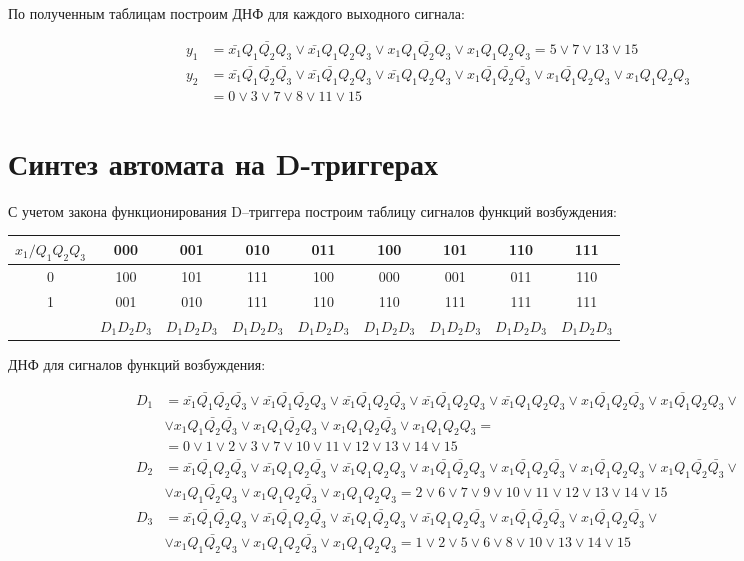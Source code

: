 \documentclass[12pt, a4paper]{article}
\begin{document}
По полученным таблицам построим ДНФ для каждого выходного сигнала:

\begin{align*}
  y_1 &= \bar{x_1}Q_1\bar{Q_2}Q_3 \lor \bar{x_1}Q_1Q_2Q_3 \lor x_1Q_1\bar{Q_2}Q_3 \lor x_1Q_1Q_2Q_3 = 5 \lor 7 \lor 13 \lor 15\\
  y_2 &= \bar{x_1}\bar{Q_1}\bar{Q_2}\bar{Q_3} \lor \bar{x_1}\bar{Q_1}Q_2Q_3 \lor \bar{x_1}Q_1Q_2Q_3 \lor x_1\bar{Q_1}\bar{Q_2}\bar{Q_3} \lor x_1\bar{Q_1}Q_2Q_3 \lor x_1Q_1Q_2Q_3\\
    &= 0 \lor 3 \lor 7 \lor 8 \lor 11 \lor 15
\end{align*}

\section*{Синтез автомата на D-триггерах}

С учетом закона функционирования D–триггера построим таблицу сигналов функций возбуждения:

\noindent
\begin{tabular}{|*{9}{c|}}
  \hline
  $x_1/Q_1Q_2Q_3$ & 000 & 001 & 010 & 011 & 100 & 101 & 110 & 111\\\hline
  0 & 100 & 101 & 111 & 100 & 000 & 001 & 011 & 110\\\hline
  1 & 001 & 010 & 111 & 110 & 110 & 111 & 111 & 111\\\hline
   & $D_1D_2D_3$ & $D_1D_2D_3$ & $D_1D_2D_3$ & $D_1D_2D_3$ & $D_1D_2D_3$ & $D_1D_2D_3$ & $D_1D_2D_3$ & $D_1D_2D_3$\\\hline
\end{tabular}

ДНФ для сигналов функций возбуждения:

\begin{align*}
  D_1 &= \bar{x_1}\bar{Q_1}\bar{Q_2}\bar{Q_3} \lor \bar{x_1}\bar{Q_1}\bar{Q_2}Q_3 \lor \bar{x_1}\bar{Q_1}Q_2\bar{Q_3} \lor \bar{x_1}\bar{Q_1}Q_2Q_3 \lor \bar{x_1}Q_1Q_2Q_3 \lor x_1\bar{Q_1}Q_2\bar{Q_3} \lor x_1\bar{Q_1}Q_2Q_3 \lor\\
  & \lor x_1Q_1\bar{Q_2}\bar{Q_3} \lor x_1Q_1\bar{Q_2}Q_3 \lor x_1Q_1Q_2\bar{Q_3} \lor x_1Q_1Q_2Q_3 =\\
  & = 0 \lor 1 \lor 2 \lor 3 \lor 7 \lor 10 \lor 11 \lor 12 \lor 13 \lor 14 \lor 15\\
  D_2 &= \bar{x_1}\bar{Q_1}Q_2\bar{Q_3} \lor \bar{x_1}Q_1Q_2\bar{Q_3} \lor \bar{x_1}Q_1Q_2Q_3 \lor x_1\bar{Q_1}\bar{Q_2}Q_3 \lor x_1\bar{Q_1}Q_2\bar{Q_3} \lor x_1\bar{Q_1}Q_2Q_3 \lor x_1Q_1\bar{Q_2}\bar{Q_3} \lor\\
  & \lor x_1Q_1\bar{Q_2}Q_3 \lor x_1Q_1Q_2\bar{Q_3} \lor x_1Q_1Q_2Q_3 = 2 \lor 6 \lor 7 \lor 9 \lor 10 \lor 11 \lor 12 \lor 13 \lor 14 \lor 15\\
  D_3 &= \bar{x_1}\bar{Q_1}\bar{Q_2}Q_3 \lor \bar{x_1}\bar{Q_1}Q_2\bar{Q_3} \lor \bar{x_1}Q_1\bar{Q_2}Q_3 \lor \bar{x_1}Q_1Q_2\bar{Q_3} \lor x_1\bar{Q_1}\bar{Q_2}\bar{Q_3} \lor x_1\bar{Q_1}Q_2\bar{Q_3} \lor \\
  & \lor x_1Q_1\bar{Q_2}Q_3 \lor x_1Q_1Q_2\bar{Q_3} \lor x_1Q_1Q_2Q_3 = 1 \lor 2 \lor 5 \lor 6 \lor 8 \lor 10 \lor 13 \lor 14 \lor 15
\end{align*}
\end{document}
